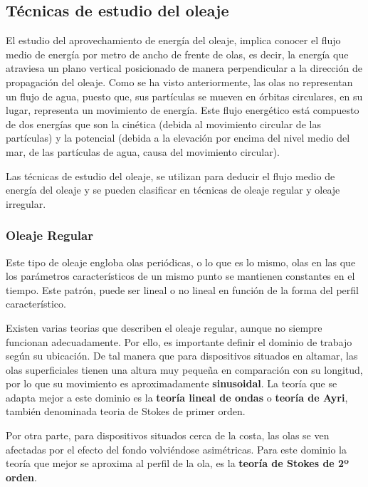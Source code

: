 \subsection{Técnicas de estudio del oleaje}\label{header-n151}

El estudio del aprovechamiento de energía del oleaje, implica conocer el
flujo medio de energía por metro de ancho de frente de olas, es decir,
la energía que atraviesa un plano vertical posicionado de manera
perpendicular a la dirección de propagación del oleaje. Como se ha visto
anteriormente, las olas no representan un flujo de agua, puesto que, sus
partículas se mueven en órbitas circulares, en su lugar, representa un
movimiento de energía. Este flujo energético está compuesto de dos
energías que son la cinética (debida al movimiento circular de las
partículas) y la potencial (debida a la elevación por encima del nivel
medio del mar, de las partículas de agua, causa del movimiento
circular).

Las técnicas de estudio del oleaje, se utilizan para deducir el flujo
medio de energía del oleaje y se pueden clasificar en técnicas de oleaje
regular y oleaje irregular.

\subsubsection{Oleaje Regular}\label{header-n156}

Este tipo de oleaje engloba olas periódicas, o lo que es lo mismo, olas
en las que los parámetros característicos de un mismo punto se mantienen
constantes en el tiempo. Este patrón, puede ser lineal o no lineal en
función de la forma del perfil característico.

Existen varias teorias que describen el oleaje regular, aunque no
siempre funcionan adecuadamente. Por ello, es importante definir el
dominio de trabajo según su ubicación. De tal manera que para
dispositivos situados en altamar, las olas superficiales tienen una
altura muy pequeña en comparación con su longitud, por lo que su
movimiento es aproximadamente \textbf{sinusoidal}. La teoría que se
adapta mejor a este dominio es la \textbf{teoría lineal de ondas} o
\textbf{teoría de Ayri}, también denominada teoria de Stokes de primer
orden.

Por otra parte, para dispositivos situados cerca de la costa, las olas
se ven afectadas por el efecto del fondo volviéndose asimétricas. Para
este dominio la teoría que mejor se aproxima al perfil de la ola, es la
\textbf{teoría de Stokes de 2º orden}.

